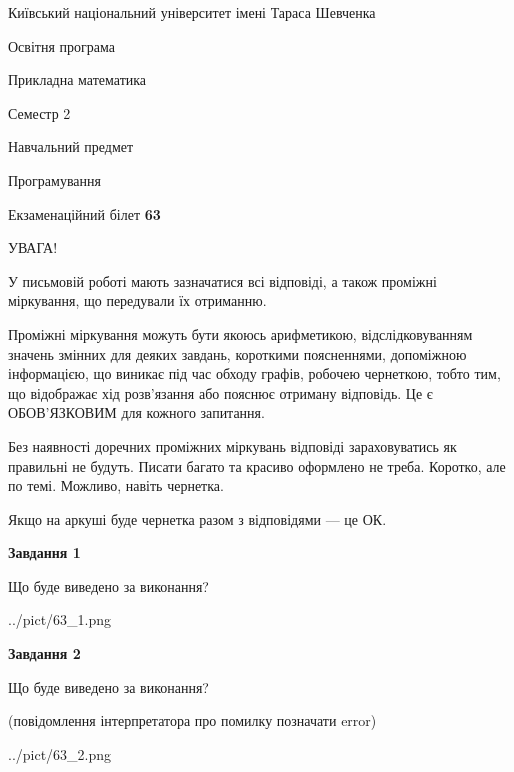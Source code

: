 \documentclass[12pt, ukrainian]{article}
\begin{document}
{{\begin {small}\par
{ \center  Київський національний університет імені Тараса Шевченка \par}
{\parbox {5 cm}{Освітня програма \hfill}{\parbox {7 cm}{Прикладна математика\hfill}}\parbox {6 cm}{\hfill Семестр 2}}\par
{\parbox {5 cm} {Навчальний предмет \hfill}\parbox {7 cm}{Програмування \hfill}\parbox {6cm}{\hfill}\par}\vspace{-7pt} \end{small}}{\center Екзаменаційний білет \No \textbf
{ 63 }\par}}
{
\begin {large}
УВАГА!

У письмовій роботі мають зазначатися всі відповіді, а також проміжні міркування, що передували їх отриманню.

Проміжні міркування можуть бути якоюсь арифметикою, відслідковуванням зна\-чень змінних для деяких завдань,
короткими поясненнями, допоміжною інформацією, що виникає під час обходу графів, робочею чернеткою,
тобто тим, що відображає хід розв’язання або пояснює отриману відповідь.
Це є ОБОВ’ЯЗКОВИМ для кожного запитання.

Без наявності доречних проміжних міркувань відповіді зараховуватись як правиль\-ні не будуть.
Писати багато та красиво оформлено не треба. Коротко, але по темі. Можли\-во, навіть чернетка.

Якщо на аркуші буде чернетка разом з відповідями --- це ОК.

\newpage

{\begin {center}\textbf{Завдання 1}\end {center}}\par
Що буде виведено за виконання?\par
\begin{center}
	{../pict/63_1.png}
\end{center}
\newpage

{\begin {center}\textbf{Завдання 2}\end {center}}\par
Що буде виведено за виконання?\par
 (повідомлення інтерпретатора про помилку позначати error)\par
\begin{center}
	{../pict/63_2.png}
\end{center}
\newpage


\end{large}}
\end{document}
